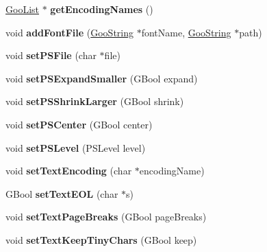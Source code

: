 \begin{DoxyCompactItemize}
\hyperlink{class_goo_list}{Goo\+List} $\ast$ {\bfseries get\+Encoding\+Names} ()
\item 
\mbox{\label{class_global_params_ae9b93b398caca7fabc50709176ced475}} 
void {\bfseries add\+Font\+File} (\hyperlink{class_goo_string}{Goo\+String} $\ast$font\+Name, \hyperlink{class_goo_string}{Goo\+String} $\ast$path)
\item 
\mbox{\label{class_global_params_a32b828fbac43f2cebc75e2bee166989c}} 
void {\bfseries set\+P\+S\+File} (char $\ast$file)
\item 
\mbox{\label{class_global_params_a86b20332157812327e70c8d0cd2874bc}} 
void {\bfseries set\+P\+S\+Expand\+Smaller} (G\+Bool expand)
\item 
\mbox{\label{class_global_params_a6ed1b8aafc25d99daae0d79a6c747f73}} 
void {\bfseries set\+P\+S\+Shrink\+Larger} (G\+Bool shrink)
\item 
\mbox{\label{class_global_params_ad992626cc1fe597407e7b40a5a391a59}} 
void {\bfseries set\+P\+S\+Center} (G\+Bool center)
\item 
\mbox{\label{class_global_params_a6eb5712afb5ac0f147f53469ccfae4f5}} 
void {\bfseries set\+P\+S\+Level} (P\+S\+Level level)
\item 
\mbox{\label{class_global_params_a95d0c79becafb56d30d0cc76f86bb3d7}} 
void {\bfseries set\+Text\+Encoding} (char $\ast$encoding\+Name)
\item 
\mbox{\label{class_global_params_ab594fb5beb538dfedbe78fbb15969e3a}} 
G\+Bool {\bfseries set\+Text\+E\+OL} (char $\ast$s)
\item 
\mbox{\label{class_global_params_ae6bbef0444138830bf3bdc99377a4944}} 
void {\bfseries set\+Text\+Page\+Breaks} (G\+Bool page\+Breaks)
\item 
\mbox{\label{class_global_params_ab28ebc43b5cebab44a894d68503ffcbf}} 
void {\bfseries set\+Text\+Keep\+Tiny\+Chars} (G\+Bool keep)
\item 

\end{DoxyCompactItemize}
